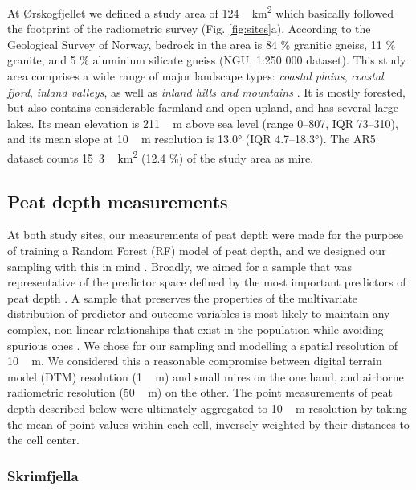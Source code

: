 \documentclass[soil, manuscript]{copernicus}
\begin{document}
At Ørskogfjellet we defined a study area of \unit{124\,km^{2}} which basically followed the footprint of the radiometric survey (Fig. \ref{fig:sites}a).
According to the Geological Survey of Norway, bedrock in the area is 84 \% granitic gneiss, 11 \% granite, and 5 \% aluminium silicate gneiss (NGU, 1:250 000 dataset).
This study area comprises a wide range of major landscape types: \emph{coastal plains}, \emph{coastal fjord}, \emph{inland valleys}, as well as \emph{inland hills and mountains} \citep{simensenDiversityDistributionLandscape2021}.
It is mostly forested, but also contains considerable farmland and open upland, and has several large lakes.
Its mean elevation is \unit{211\,m} above sea level (range 0--807, IQR 73--310), and its mean slope at \unit{10\,m} resolution is 13.0° (IQR 4.7--18.3°).
The AR5 dataset counts \unit{15.3\,km^{2}} (12.4 \%) of the study area as mire.

\subsection{Peat depth measurements}

At both study sites, our measurements of peat depth were made for the purpose of training a Random Forest (RF) model of peat depth, and we designed our sampling with this in mind \citep{brusSamplingDigitalSoil2019}.
Broadly, we aimed for a sample that was representative of the predictor space defined by the most important predictors of peat depth \citep{wadouxSamplingDesignOptimization2019, maComparisonConditionedLatin2020}.
A sample that preserves the properties of the multivariate distribution of predictor and outcome variables is most likely to maintain any complex, non-linear relationships that exist in the population while avoiding spurious ones \citep{brusSamplingDigitalSoil2019}.
We chose for our sampling and modelling a spatial resolution of \unit{10\,m}.
We considered this a reasonable compromise between digital terrain model (DTM) resolution (\unit{1\,m}) and small mires on the one hand, and airborne radiometric resolution (\unit{50\,m}) on the other.
The point measurements of peat depth described below were ultimately aggregated to \unit{10\,m} resolution by taking the mean of point values within each cell, inversely weighted by their distances to the cell center.

\subsubsection{Skrimfjella}
\end{document}
